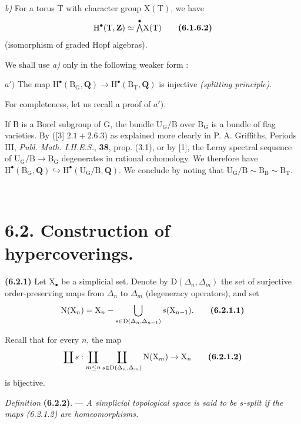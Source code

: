 \documentclass[11pt,leqno]{article}
\newcommand{\Page}[1]{\ifvmode\noindent\else\unskip\ \fi{\footnotesize\textcolor{gray}{[p.\,#1]}}\ \ignorespaces}
\begin{document}
\textit{b)} For a torus \(\mathrm{T}\) with character group \(\mathrm{X}(\mathrm{T})\), we have
\[
\mathrm{H}^{\bullet}(\mathrm{T},\mathbf{Z})
\simeq\overset{\bullet}{\mathop{\textstyle\bigwedge}}\mathrm{X}(\mathrm{T})
\tag*{\textbf{(6.1.6.2)}}
\]
(isomorphism of graded Hopf algebras).

We shall use \textit{a)} only in the following weaker form :

\(a')\) The map \(\mathrm{H}^{\bullet}(\mathrm{B}_{\mathrm{G}},\mathbf{Q})\to\mathrm{H}^{\bullet}(\mathrm{B}_{\mathrm{T}},\mathbf{Q})\) is injective \textit{(splitting principle)}.

For completeness, let us recall a proof of \(a')\).

If \(\mathrm{B}\) is a Borel subgroup of \(\mathrm{G}\), the bundle \(\mathrm{U}_{\mathrm{G}}/\mathrm{B}\) over \(\mathrm{B}_{\mathrm{G}}\) is a bundle of flag varieties. By ([3] \(2.1+2.6.3\)) as explained more clearly in P. A. Griffiths, Periods III, \textit{Publ. Math. I.H.E.S.}, \textbf{38}, prop. (3.1), or by [1], the Leray spectral sequence of \(\mathrm{U}_{\mathrm{G}}/\mathrm{B}\to\mathrm{B}_{\mathrm{G}}\) degenerates in rational cohomology. We therefore have \(\mathrm{H}^{\bullet}(\mathrm{B}_{\mathrm{G}},\mathbf{Q})\hookrightarrow\mathrm{H}^{\bullet}(\mathrm{U}_{\mathrm{G}}/\mathrm{B},\mathbf{Q})\). We conclude by noting that \(\mathrm{U}_{\mathrm{G}}/\mathrm{B}\sim\mathrm{B}_{\mathrm{B}}\sim\mathrm{B}_{\mathrm{T}}\).

\Page{19}
\section*{6.2. Construction of hypercoverings.}

\textbf{(6.2.1)} Let \(\mathrm{X}_{\bullet}\) be a simplicial set. Denote by \(\mathrm{D}(\Delta_n,\Delta_m)\) the set of surjective order-preserving maps from \(\Delta_n\) to \(\Delta_m\) (degeneracy operators), and set
\[
\mathrm{N}(\mathrm{X}_n)
=\mathrm{X}_n-\bigcup_{s\in\mathrm{D}(\Delta_n,\Delta_{n-1})}
s(\mathrm{X}_{n-1}).
\tag*{\textbf{(6.2.1.1)}}
\]

Recall that for every \(n\), the map
\[
\coprod s:
\coprod_{m\leq n}\coprod_{s\in\mathrm{D}(\Delta_n,\Delta_m)}
\mathrm{N}(\mathrm{X}_m)\to\mathrm{X}_n
\tag*{\textbf{(6.2.1.2)}}
\]
is bijective.

\textit{Definition} \textbf{(6.2.2)}. — \textit{A simplicial topological space is said to be \textup{\(s\)-split} if the maps \textup{(6.2.1.2)} are homeomorphisms.}
\end{document}
